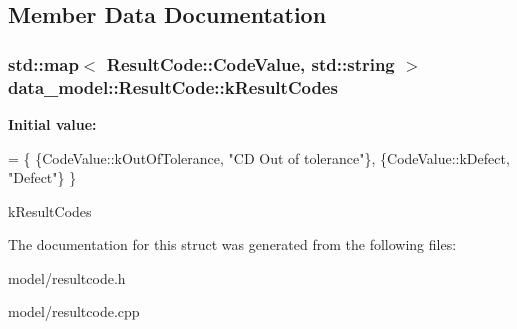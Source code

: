 \subsection{Member Data Documentation}
\subsubsection[{\texorpdfstring{k\+Result\+Codes}{kResultCodes}}]{\setlength{\rightskip}{0pt plus 5cm}std\+::map$<$ {\bf Result\+Code\+::\+Code\+Value}, std\+::string $>$ data\+\_\+model\+::\+Result\+Code\+::k\+Result\+Codes\hspace{0.3cm}{\ttfamily [static]}}\hypertarget{structdata__model_1_1_result_code_adba7e4beae8cd77b2c9cc807d77f0b19}{}\label{structdata__model_1_1_result_code_adba7e4beae8cd77b2c9cc807d77f0b19}
{\bfseries Initial value\+:}
\begin{DoxyCode}
= \{
    \{CodeValue::kOutOfTolerance,
     \textcolor{stringliteral}{"CD Out of tolerance"}\},       
    \{CodeValue::kDefect, \textcolor{stringliteral}{"Defect"}\} 
\}
\end{DoxyCode}


k\+Result\+Codes 



The documentation for this struct was generated from the following files\+:\begin{DoxyCompactItemize}
\item 
model/resultcode.\+h\item 
model/resultcode.\+cpp\end{DoxyCompactItemize}
